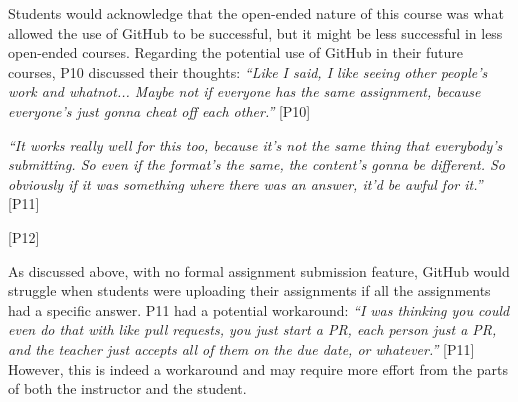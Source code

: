 Students would acknowledge that the open-ended nature of this course was what allowed the use of GitHub to be successful, but it might be less successful in less open-ended courses. Regarding the potential use of GitHub in their future courses, P10 discussed their thoughts: \textit{``Like I said, I like seeing other people's work and whatnot... Maybe not if everyone has the same assignment, because everyone's just gonna cheat off each other.''} [P10]

\textit{``It works really well for this too, because it's not the same thing that everybody's submitting. So even if the format's the same, the content's gonna be different. So obviously if it was something where there was an answer, it'd be awful for it.''} [P11]

 [P12]

As discussed above, with no formal assignment submission feature, GitHub would struggle when students were uploading their assignments if all the assignments had a specific answer. P11 had a potential workaround: \textit{``I was thinking you could even do that with like pull requests, you just start a PR, each person just a PR, and the teacher just accepts all of them on the due date, or whatever.''} [P11] However, this is indeed a workaround and may require more effort from the parts of both the instructor and the student.





